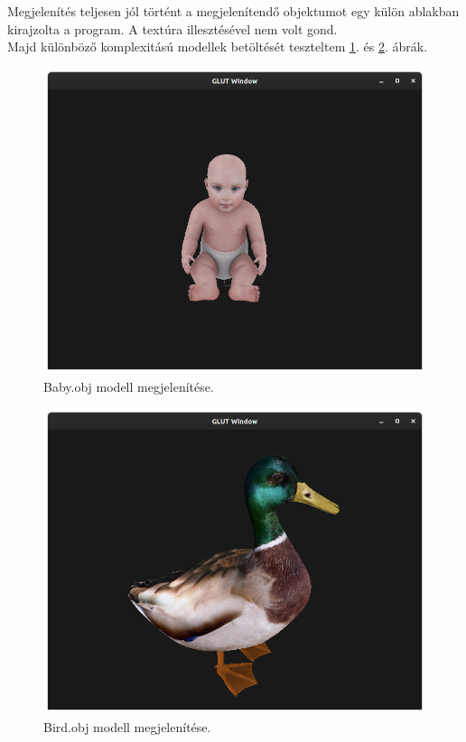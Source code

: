 Megjelenítés teljesen jól történt a megjelenítendő objektumot egy külön ablakban kirajzolta a program. A textúra illesztésével nem volt gond.\\
\newpage
Majd különböző komplexitású modellek betöltését teszteltem \ref{fig:modelbaby}. és  \ref{fig:modelbird}. ábrák.
\bigskip
\begin{figure}[h]
\centering
\includegraphics[scale=0.35]{images/model1.png}
\caption{Baby.obj modell megjelenítése.}
\label{fig:modelbaby}
\end{figure}
\bigskip
\begin{figure}[h]
\centering
\includegraphics[scale=0.35]{images/bird.png}
\caption{Bird.obj modell megjelenítése.}
\label{fig:modelbird}
\end{figure}
\bigskip

